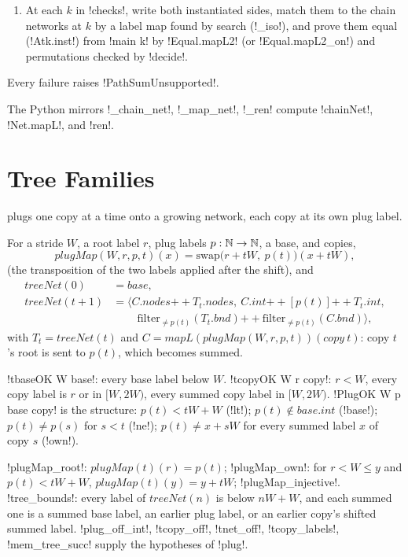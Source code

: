 {\begin{algorithm}
\begin{enumerate}
\item At each $k$ in \py!checks!, write both instantiated sides, match them to the chain networks at $k$ by a label map found by search (\py!_iso!), and prove them equal (\lbx!At{k}.inst!) from \lbx!main k! by \lbx!Equal.mapL2! (or \lbx!Equal.mapL2_on!) and permutations checked by \lbx!decide!.
\end{enumerate}
Every failure raises \py!PathSumUnsupported!.
\end{algorithm}
The Python mirrors \py!_chain_net!, \py!_map_net!, \py!_ren! compute \lbx!chainNet!, \lbx!Net.mapL!, and \lbx!ren!.

\section{Tree Families}\label{sec:boxes-tree}

 plugs one copy at a time onto a growing network, each copy at its own plug label.

\begin{definition}\label{def:boxes-treeNet}
For a stride $W$, a root label $r$, plug labels $p:\mathbb{N}\to\mathbb{N}$, a base, and copies,
\[
\mathit{plugMap}(W,r,p,t)(x)=\mathrm{swap}\bigl(r+tW,\ p(t)\bigr)(x+tW),
\]
(the transposition of the two labels applied after the shift), and
\begin{align*}
\mathit{treeNet}(0)&=\mathit{base},\\
\mathit{treeNet}(t{+}1)&=\bigl\langle C.\mathit{nodes}\mathbin{+\!\!+}T_t.\mathit{nodes},\ C.\mathit{int}\mathbin{+\!\!+}[p(t)]\mathbin{+\!\!+}T_t.\mathit{int},\\ &\qquad\ \mathrm{filter}_{\ne p(t)}(T_t.\mathit{bnd})\mathbin{+\!\!+}\mathrm{filter}_{\ne p(t)}(C.\mathit{bnd})\bigr\rangle,
\end{align*}
with $T_t=\mathit{treeNet}(t)$ and $C=\mathit{mapL}(\mathit{plugMap}(W,r,p,t))(\mathit{copy}\ t)$: copy $t$'s root is sent to $p(t)$, which becomes summed.
\end{definition}

\begin{definition}\label{def:boxes-tcopyOK}
\lbx!tbaseOK W base!: every base label below $W$. \lbx!tcopyOK W r copy!: $r<W$, every copy label is $r$ or in $[W,2W)$, every summed copy label in $[W,2W)$. \lbx!PlugOK W p base copy! is the structure: $p(t)<tW+W$ (\lbx!lt!); $p(t)\notin\mathit{base.int}$ (\lbx!base!); $p(t)\ne p(s)$ for $s<t$ (\lbx!ne!); $p(t)\ne x+sW$ for every summed label $x$ of copy $s$ (\lbx!own!).
\end{definition}
\lbx!plugMap_root!: $\mathit{plugMap}(t)(r)=p(t)$; \lbx!plugMap_own!: for $r<W\le y$ and $p(t)<tW+W$, $\mathit{plugMap}(t)(y)=y+tW$; \lbx!plugMap_injective!. \lbx!tree_bounds!: every label of $\mathit{treeNet}(n)$ is below $nW+W$, and each summed one is a summed base label, an earlier plug label, or an earlier copy's shifted summed label. \lbx!plug_off_int!, \lbx!tcopy_off!, \lbx!tnet_off!, \lbx!tcopy_labels!, \lbx!mem_tree_succ! supply the hypotheses of \lbx!plug!.

}
